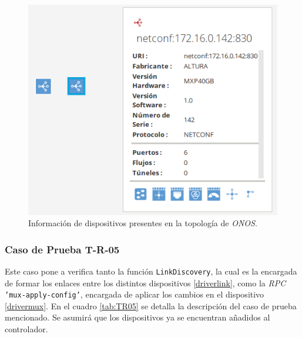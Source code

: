   \begin{figure}[H]
	\centering
	\includegraphics[scale=0.5]{Figures/test4_consulta.png}
	\caption{Información de dispositivos presentes en la topología de \textit{ONOS}.}
	\label{fig:test4_consulta}
  \end{figure}

  \subsubsection{Caso de Prueba T-R-05}

  Este caso pone a verifica tanto la función \texttt{LinkDiscovery}, la cual es la encargada de formar los enlaces entre los distintos dispositivos \ref{driverlink}, como la  \textit{RPC} \texttt{'mux-apply-config'}, encargada de aplicar los cambios en el dispositivo \ref{drivermux}. 
  En el cuadro \ref{tab:TR05} se detalla la descripción del caso de prueba mencionado. Se asumirá que los dispositivos ya se encuentran añadidos al controlador.
  

